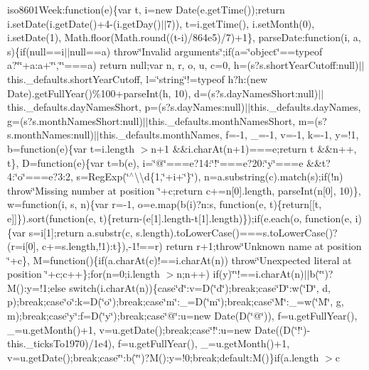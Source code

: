 {{\begin{DoxyParamCaption}
iso8601\+Week\+:function(e)\{var t, i=new Date(e.\+get\+Time());return i.\+set\+Date(i.\+get\+Date()+4-\/(i.\+get\+Day()$\vert$$\vert$7)), t=i.\+get\+Time(), i.\+set\+Month(0), i.\+set\+Date(1), Math.\+floor(\+Math.\+round((t-\/i)/864e5)/7)+1\}, parse\+Date\+:function(i, a, s)\{if(null==i$\vert$$\vert$null==a) throw\char`\"{}\+Invalid arguments\char`\"{};if(a=\char`\"{}object\char`\"{}==typeof a?\char`\"{}\char`\"{}+a\+:a+\char`\"{}\char`\"{},\char`\"{}\char`\"{}===a) return null;var n, r, o, u, c=0, h=(s?s.\+short\+Year\+Cutoff\+:null)$\vert$$\vert$this.\+\_\+defaults.\+short\+Year\+Cutoff, l=\char`\"{}string\char`\"{}!=typeof h?h\+:(new Date).\+get\+Full\+Year()\%100+parse\+Int(h, 10), d=(s?s.\+day\+Names\+Short\+:null)$\vert$$\vert$this.\+\_\+defaults.\+day\+Names\+Short, p=(s?s.\+day\+Names\+:null)$\vert$$\vert$this.\+\_\+defaults.\+day\+Names, g=(s?s.\+month\+Names\+Short\+:null)$\vert$$\vert$this.\+\_\+defaults.\+month\+Names\+Short, m=(s?s.\+month\+Names\+:null)$\vert$$\vert$this.\+\_\+defaults.\+month\+Names, f=-\/1, \+\_\+=-\/1, v=-\/1, k=-\/1, y=!1, b=function(e)\{var t=i.\+length $>$n+1 \&\&i.\+char\+At(n+1)===e;return t \&\&n++, t\}, D=function(e)\{var t=b(e), i=\char`\"{}@\char`\"{}===e?14\+:\char`\"{}!\char`\"{}===e?20\+:\char`\"{}y\char`\"{}===e \&\&t?4\+:\char`\"{}o\char`\"{}===e?3\+:2, s=\+Reg\+Exp(\char`\"{}$^\wedge$\textbackslash{}\textbackslash{}d\{1,\char`\"{}+i+\char`\"{}\}\char`\"{}), n=a.\+substring(c).\+match(s);if(!n) throw\char`\"{}\+Missing number at position \char`\"{}+c;return c+=n\mbox{[}0\mbox{]}.\+length, parse\+Int(n\mbox{[}0\mbox{]}, 10)\}, w=function(i, s, n)\{var r=-\/1, o=e.\+map(b(i)?n\+:s, function(e, t)\{return\mbox{[}\mbox{[}t, e\mbox{]}\mbox{]}\}).\+sort(function(e, t)\{return-\/(e\mbox{[}1\mbox{]}.\+length-\/t\mbox{[}1\mbox{]}.\+length)\});if(e.\+each(o, function(e, i)\{var s=i\mbox{[}1\mbox{]};return a.\+substr(c, s.\+length).\+to\+Lower\+Case()===s.\+to\+Lower\+Case()?(r=i\mbox{[}0\mbox{]}, c+=s.\+length,!1)\+:t\}),-\/1!==r) return r+1;throw\char`\"{}\+Unknown name at position \char`\"{}+c\}, M=function()\{if(a.\+char\+At(c)!==i.\+char\+At(n)) throw\char`\"{}\+Unexpected literal at position \char`\"{}+c;c++\};for(n=0;i.\+length $>$n;n++) if(y)\char`\"{}\textquotesingle{}\char`\"{}!==i.\+char\+At(n)$\vert$$\vert$b(\char`\"{}\textquotesingle{}\char`\"{})?\+M()\+:y=!1;else switch(i.\+char\+At(n))\{case\char`\"{}d\char`\"{}\+:v=\+D(\char`\"{}d\char`\"{});break;case\char`\"{}\+D\char`\"{}\+:w(\char`\"{}\+D\char`\"{}, d, p);break;case\char`\"{}o\char`\"{}\+:k=\+D(\char`\"{}o\char`\"{});break;case\char`\"{}m\char`\"{}\+:\+\_\+=\+D(\char`\"{}m\char`\"{});break;case\char`\"{}\+M\char`\"{}\+:\+\_\+=w(\char`\"{}\+M\char`\"{}, g, m);break;case\char`\"{}y\char`\"{}\+:f=\+D(\char`\"{}y\char`\"{});break;case\char`\"{}@\char`\"{}\+:u=new Date(\+D(\char`\"{}@\char`\"{})), f=u.\+get\+Full\+Year(), \+\_\+=u.\+get\+Month()+1, v=u.\+get\+Date();break;case\char`\"{}!\char`\"{}\+:u=new Date((\+D(\char`\"{}!\char`\"{})-\/this.\+\_\+ticks\+To1970)/1e4), f=u.\+get\+Full\+Year(), \+\_\+=u.\+get\+Month()+1, v=u.\+get\+Date();break;case\char`\"{}\textquotesingle{}\char`\"{}\+:b(\char`\"{}\textquotesingle{}\char`\"{})?\+M()\+:y=!0;break;default\+:\+M()\}if(a.\+length $>$c 
\end{DoxyParamCaption}}}
